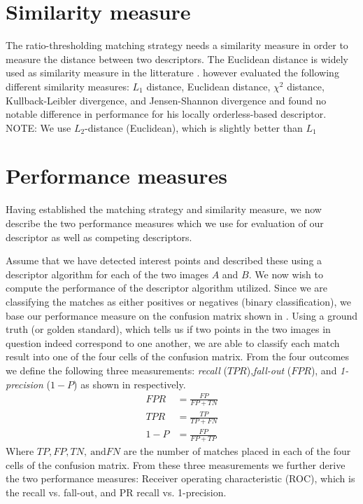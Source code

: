 \documentclass[thesis.tex]{subfiles}
\newcommand\TPR{\mathit{TPR}}
\newcommand\FPR{\mathit{FPR}}
\newcommand\OMP{\mathit{1-P}}
\newcommand\TP{\mathit{TP}}
\newcommand\FP{\mathit{FP}}
\newcommand\TN{\mathit{TN}}
\newcommand\FN{\mathit{FN}}
\newcommand\ROC{ROC}
\newcommand\PR{PR}
\begin{document}
\section{Similarity measure}
\label{sec:similarity_measure}
The ratio-thresholding matching strategy needs a similarity measure in order to measure the distance between two descriptors. The Euclidean distance is widely used as similarity measure in the litterature \cite{lowe2004distinctive,ke2004pca,mikolajczyk2005performance}. \citet{larsen2012in} however evaluated the following different similarity measures: $L_1$ distance, Euclidean distance, $\chi^2$ distance, Kullback-Leibler divergence, and Jensen-Shannon divergence and found no notable difference in performance for his locally orderless-based descriptor.
NOTE: We use $L_2$-distance (Euclidean), which is slightly better than $L_1$

\section{Performance measures}
\label{sec:performance_measures}

Having established the matching strategy and similarity measure, we now describe the two performance measures which we use for evaluation of our descriptor as well as competing descriptors.

Assume that we have detected interest points and described these using a descriptor algorithm for each of the two images $A$ and $B$. We now wish to compute the performance of the descriptor algorithm utilized.
 Since we are classifying the matches as either positives or negatives (binary classification), we base our performance measure on the confusion matrix shown in . Using a ground truth (or golden standard), which tells us if two points in the two images in question indeed correspond to one another, we are able to classify each match result into one of the four cells of the confusion matrix. From the four outcomes we define the following three measurements: \emph{recall} ($\TPR$),\emph{fall-out} ($\FPR$), and \emph{1-precision} ($\OMP$) as shown in  respectively.
\begin{align}
	\label{eq:fpr}
	\FPR &= \frac{\FP}{\FP + \TN} \\
	\label{eq:tpr}
	\TPR &= \frac{\TP}{\TP + \FN} \\
	\label{eq:omp}
	\OMP &= \frac{\FP}{\FP + \TP}
\end{align}
Where $\TP,\FP,\TN,~\text{and} \FN$ are the number of matches placed in each of the four cells of the confusion matrix.
From these three measurements we further derive the two performance measures: Receiver operating characteristic (\ROC), which is the recall vs. fall-out, and \PR {} recall vs. 1-precision.
\end{document}
